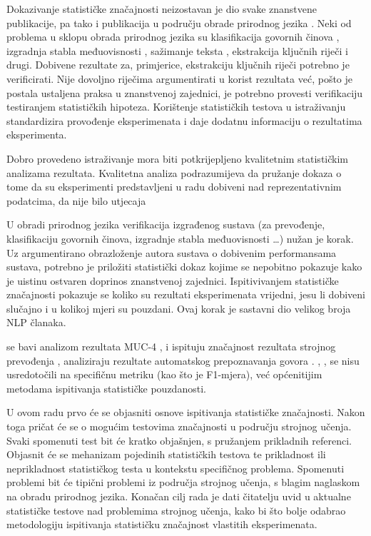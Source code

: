 Dokazivanje statističke značajnosti neizostavan je dio svake znanstvene publikacije, pa tako i publikacija u području obrade prirodnog jezika . Neki od problema u sklopu obrada prirodnog jezika su klasifikacija govornih činova  \citep{pratt1977toward}, izgradnja stabla međuovisnosti  \citep{collins2003head}, sažimanje teksta , ekstrakcija ključnih riječi  i drugi. Dobivene rezultate za, primjerice, ekstrakciju ključnih riječi potrebno je verificirati. Nije dovoljno riječima argumentirati u korist rezultata već, pošto je postala ustaljena praksa u znanstvenoj zajednici, je potrebno provesti verifikaciju testiranjem statističkih hipoteza. Korištenje statističkih testova u istraživanju standardizira provođenje eksperimenata i daje dodatnu informaciju o rezultatima eksperimenta.

Dobro provedeno istraživanje mora biti potkrijepljeno kvalitetnim statističkim analizama rezultata. Kvalitetna analiza podrazumijeva da pružanje dokaza o tome da su eksperimenti predstavljeni u radu dobiveni nad reprezentativnim podatcima, da nije bilo utjecaja 

U obradi prirodnog jezika  verifikacija izgrađenog sustava (za prevođenje, klasifikaciju govornih činova, izgradnje stabla međuovisnosti \dots) nužan je korak. Uz argumentirano obrazloženje autora sustava o dobivenim performansama sustava, potrebno je priložiti statistički dokaz kojime se nepobitno pokazuje kako je uistinu ostvaren doprinos znanstvenoj zajednici. Ispitivivanjem statističke značajnosti pokazuje se koliko su rezultati eksperimenata vrijedni, jesu li dobiveni slučajno i u kolikoj mjeri su pouzdani. Ovaj korak je sastavni dio velikog broja NLP članaka.

\citep{chinchor1992statistical} se bavi analizom rezultata MUC-4 , \citep{koehn2004statistical} i \citep{zhang2004interpreting} ispituju značajnost rezultata strojnog prevođenja , \citep{bisani2004bootstrap} analiziraju rezultate automatskog prepoznavanja govora . \citep{berg2012empirical}, \citep{yeh2000more} , \citep{thompson1993use} se nisu usredotočili na specifičnu metriku (kao što je F1-mjera), već općenitijim metodama ispitivanja statističke pouzdanosti.

U ovom radu prvo će se objasniti osnove ispitivanja statističke značajnosti. Nakon toga pričat će se o mogućim testovima značajnosti u području strojnog učenja. Svaki spomenuti test bit će kratko objašnjen, s pružanjem prikladnih referenci. Objasnit će se mehanizam pojedinih statističkih testova te prikladnost ili neprikladnost statističkog testa u kontekstu specifičnog problema. Spomenuti problemi bit će tipični problemi iz područja strojnog učenja, s blagim naglaskom na obradu prirodnog jezika. Konačan cilj rada je dati čitatelju uvid u aktualne statističke testove nad problemima strojnog učenja, kako bi što bolje odabrao metodologiju ispitivanja statističku značajnost vlastitih eksperimenata.